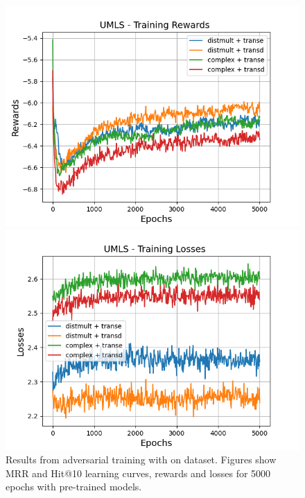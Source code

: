 \begin{figure}
    \begin{minipage}{.5\textwidth}
      \centering
      \includegraphics[width=\linewidth]{figures/results/gan_train/pretrained/random/umls/gan_train_random_umls_rewards.png}
    \end{minipage}%
     \begin{minipage}{.5\textwidth}
      \centering
      \includegraphics[width=\linewidth]{figures/results/gan_train/pretrained/random/umls/gan_train_random_umls_losses.png}
    \end{minipage}%
    \caption{Results from adversarial training with \origsampling on \umls dataset.
    Figures show MRR and Hit@10 learning curves, rewards and losses for 5000 epochs with pre-trained models.}
    \label{fig:gan_train_pretrained_random_umls}
\end{figure}
